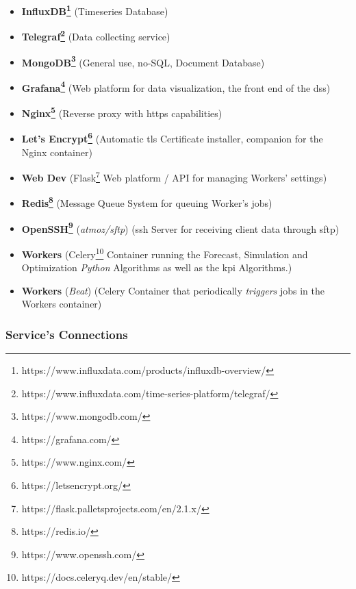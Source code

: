 \begin{itemize} 

\item \textbf{InfluxDB\footnote{https://www.influxdata.com/products/influxdb-overview/}\label{foot:influxdb}} (Timeseries Database)
\item \textbf{Telegraf\footnote{https://www.influxdata.com/time-series-platform/telegraf/}\label{foot:telegraf}} (Data collecting service)
\item \textbf{MongoDB\footnote{https://www.mongodb.com/}\label{foot:mongodb}} (General use, no-SQL, Document Database)
\item \textbf{Grafana\footnote{https://grafana.com/}\label{foot:grafana}} (Web platform for data visualization, the front end of the \gls{dss})
\item \textbf{Nginx\footnote{https://www.nginx.com/}\label{foot:nginx}} (Reverse proxy with \gls{https} capabilities)
\item \textbf{Let's Encrypt\footnote{https://letsencrypt.org/}\label{foot:letsencrypt}} (Automatic \gls{tls} Certificate installer, companion for the Nginx container)
\item \textbf{Web Dev} (Flask\footnote{https://flask.palletsprojects.com/en/2.1.x/}\label{foot:flask} Web platform / API for managing Workers' settings)
\item \textbf{Redis\footnote{https://redis.io/}\label{foot:redis}} (Message Queue System for queuing Worker's jobs)
\item \textbf{OpenSSH\footnote{https://www.openssh.com/}\label{foot:openssh}} (\textit{atmoz/sftp}) (\gls{ssh} Server for receiving client data through \gls{sftp})
\item \textbf{Workers} (Celery\footnote{https://docs.celeryq.dev/en/stable/}\label{foot:celery} Container running the Forecast, Simulation and Optimization \textit{Python} Algorithms as well as the \gls{kpi} Algorithms.)
\item \textbf{Workers} (\textit{Beat}) (Celery Container that periodically \textit{triggers} jobs in the Workers container)

\end{itemize}


\subsubsection{Service's Connections}

